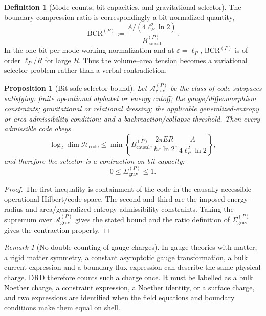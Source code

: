 \documentclass[11pt,a4paper]{article}
\newtheorem{proposition}[theorem]{Proposition}
\theoremstyle{definition}
\newtheorem{definition}[theorem]{Definition}
\theoremstyle{remark}
\newtheorem{remark}[theorem]{Remark}
\newcommand{\BCR}{\mathrm{BCR}}
\newcommand{\Bcausal}{B_{\mathrm{causal}}}
\begin{document}
\begin{definition}[Mode counts, bit capacities, and gravitational selector]
The boundary-compression ratio is correspondingly a bit-normalized quantity,
\begin{equation}
\BCR^{(P)}:=\frac{A/(4\ell_P^2\ln2)}{\Bcausal^{(P)}}.
\end{equation}
In the one-bit-per-mode working normalization and at \(\varepsilon=\ell_P\), \(\BCR^{(P)}\)
is of order \(\ell_P/R\) for large \(R\).  Thus the volume--area tension becomes a variational
selector problem rather than a verbal contradiction.
\end{definition}

\begin{proposition}[Bit-safe selector bound]
\label{prop:selector-bound}
Let $\mathcal A_{\mathrm{grav}}^{(P)}$ be the class of code subspaces satisfying: finite
operational alphabet or energy cutoff; the gauge/diffeomorphism constraints; gravitational or
relational dressing; the applicable generalized-entropy or area admissibility condition; and a
backreaction/collapse threshold.  Then every admissible code obeys
\[
\log_2\dim\mathcal H_{\mathrm{code}}\le
\min\left\{\Bcausal^{(P)},\frac{2\pi ER}{\hbar c\ln2},
\frac{A}{4\ell_P^2\ln2}\right\},
\]
and therefore the selector is a contraction on bit capacity:
\[
0\le \Sigma_{\mathrm{grav}}^{(P)}\le 1.
\]
\end{proposition}

\begin{proof}
The first inequality is containment of the code in the causally accessible operational
Hilbert/code space.  The second and third are the imposed energy--radius and area/generalized
entropy admissibility constraints.  Taking the supremum over
$\mathcal A_{\mathrm{grav}}^{(P)}$ gives the stated bound and the ratio definition of
$\Sigma_{\mathrm{grav}}^{(P)}$ gives the contraction property.
\end{proof}

\begin{remark}[No double counting of gauge charges]
In gauge theories with matter, a rigid matter symmetry, a constant asymptotic gauge
transformation, a bulk current expression and a boundary flux expression can describe the same
physical charge.  DRD therefore counts such a charge once.  It must be labelled as a bulk
Noether charge, a constraint expression, a Noether identity, or a surface charge, and two
expressions are identified when the field equations and boundary conditions make them equal on
shell.
\end{remark}
\end{document}
